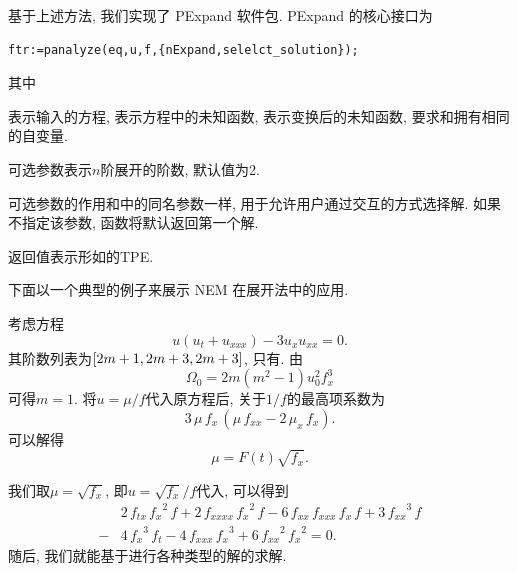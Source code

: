 基于上述方法, 我们实现了 PExpand 软件包. PExpand 的核心接口为
\begin{verbatim}
ftr:=panalyze(eq,u,f,{nExpand,selelct_solution});
\end{verbatim}
其中
\begin{compactitem}[\textbullet]
\item {}表示输入的方程, 表示方程中的未知函数, 表示变换后的未知函数, 要求和拥有相同的自变量.
\item 可选参数表示$n$阶展开的阶数, 默认值为2.
\item 可选参数的作用和中的同名参数一样, 用于允许用户通过交互的方式选择解. 如果不指定该参数, 函数将默认返回第一个解. 
\item 返回值表示形如的TPE. 
\end{compactitem}

下面以一个典型的例子来展示 NEM 在\Painleve{}展开法中的应用.

\begin{example}
考虑方程
\begin{equation}
    u(u_t+u_{xxx})-3u_x u_{xx}=0. \label{pseq}
\end{equation}
其阶数列表为$\left[2m+1,2m+3,2m+3\right]$, 只有\BPthree{}. 由
\begin{equation}
    \Omega_0=2m(m^2-1)u_0^2f_x^3
\end{equation}
可得$m=1$. 将$u=\mu/f$代入原方程后, 关于$1/f$的最高项系数为
\begin{equation}
    3\,\mu\,{{f}_{x}}\,\left( \mu\,{{f}_{xx}}-2\,{{\mu}_{x}}\,{{f}_{x}}\right) .
\end{equation}
可以解得 
\begin{equation}
    \mu=F(t)\sqrt{f_x}.
\end{equation}
\end{example}
我们取$\mu=\sqrt{f_x}$, 即$u=\sqrt{f_x}/f$代入, 可以得到
\begin{equation}
\begin{split}
& 2\,{{f}_{tx}}\,{{{f}_{x}}}^{2}\,f+2\,{{f}_{xxxx}}\,{{{f}_{x}}}^{2}\,f-6\,{{f}_{xx}}\,{{f}_{xxx}}\,{{f}_{x}}\,f+3\,{{{f}_{xx}}}^{3}\,f \\
-&4\,{{{f}_{x}}}^{3}\,{{f}_{t}}-4\,{{f}_{xxx}}\,{{{f}_{x}}}^{3}+6\,{{{f}_{xx}}}^{2}\,{{{f}_{x}}}^{2}=0.
\end{split} \label{pseq-f}
\end{equation}
随后, 我们就能基于进行各种类型的解的求解.


